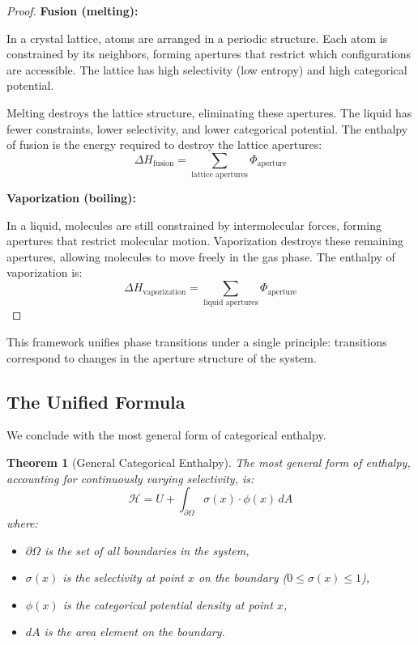 \documentclass[12pt,a4paper]{article}
\newtheorem{theorem}{Theorem}[section]
\theoremstyle{definition}
\theoremstyle{remark}
\begin{document}
\begin{proof}
\textbf{Fusion (melting):}

In a crystal lattice, atoms are arranged in a periodic structure. Each atom is constrained by its neighbors, forming apertures that restrict which configurations are accessible. The lattice has high selectivity (low entropy) and high categorical potential.

Melting destroys the lattice structure, eliminating these apertures. The liquid has fewer constraints, lower selectivity, and lower categorical potential. The enthalpy of fusion is the energy required to destroy the lattice apertures:
\begin{equation}
\Delta H_{\text{fusion}} = \sum_{\text{lattice apertures}} \Phi_{\text{aperture}}
\end{equation}

\textbf{Vaporization (boiling):}

In a liquid, molecules are still constrained by intermolecular forces, forming apertures that restrict molecular motion. Vaporization destroys these remaining apertures, allowing molecules to move freely in the gas phase. The enthalpy of vaporization is:
\begin{equation}
\Delta H_{\text{vaporization}} = \sum_{\text{liquid apertures}} \Phi_{\text{aperture}}
\end{equation}
\end{proof}

This framework unifies phase transitions under a single principle: transitions correspond to changes in the aperture structure of the system.

\subsection{The Unified Formula}

We conclude with the most general form of categorical enthalpy.

\begin{theorem}[General Categorical Enthalpy]
\label{thm:general_enthalpy}
The most general form of enthalpy, accounting for continuously varying selectivity, is:
\begin{equation}
\boxed{\mathcal{H} = U + \int_{\partial \Omega} \sigma(x) \cdot \phi(x) \, dA}
\end{equation}
where:
\begin{itemize}
    \item $\partial \Omega$ is the set of all boundaries in the system,
    \item $\sigma(x)$ is the selectivity at point $x$ on the boundary ($0 \leq \sigma(x) \leq 1$),
    \item $\phi(x)$ is the categorical potential density at point $x$,
    \item $dA$ is the area element on the boundary.
\end{itemize}
\end{theorem}
\end{document}
